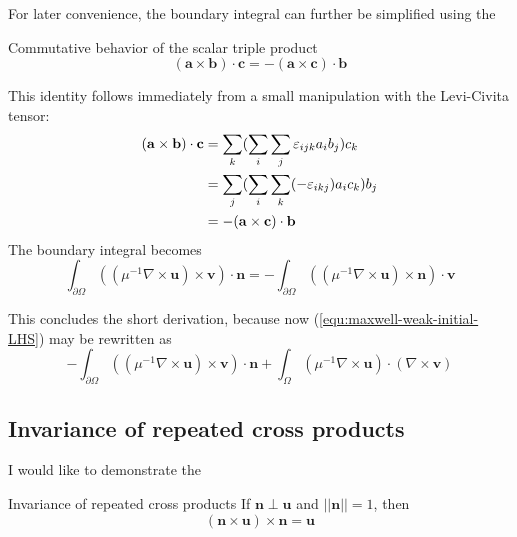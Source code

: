 \documentclass[11pt, a4paper]{article}
\begin{document}
For later convenience, the boundary integral can further be simplified using the
\begin{fancybox}{Commutative behavior of the scalar triple product}
    \begin{equation}
        (\mathbf{a} \times \mathbf{b}) \cdot \mathbf{c} = - (\mathbf{a} \times \mathbf{c}) \cdot \mathbf{b} \label{equ:vector-algebra}
    \end{equation}
\end{fancybox}
This identity follows immediately from a small manipulation with the Levi-Civita
tensor:
\begin{align}
    (\mathbf{a} \times \mathbf{b}) \cdot \mathbf{c} &= \sum_k (\sum_i \sum_j \varepsilon_{ijk} a_i b_j) c_k \notag \\
     &= \sum_j (\sum_i \sum_k (-\varepsilon_{ikj}) a_i c_k) b_j \notag \\ 
     &= - (\mathbf{a} \times \mathbf{c}) \cdot \mathbf{b} 
\end{align}
The boundary integral becomes 
\begin{equation}
    \int_{\partial \Omega} (({\mu^{-1} \nabla \times \mathbf{u}}) \times \mathbf{v}) \cdot \mathbf{n}
    = - \int_{\partial \Omega} (({\mu^{-1} \nabla \times \mathbf{u}}) \times \mathbf{n}) \cdot \mathbf{v}
\end{equation}

This concludes the short derivation, because now (\ref{equ:maxwell-weak-initial-LHS})
may be rewritten as
\begin{equation}
    - \int_{\partial \Omega} (({\mu^{-1} \nabla \times \mathbf{u}}) \times \mathbf{v}) \cdot \mathbf{n}
    + \int_{\Omega} ({\mu^{-1} \nabla \times \mathbf{u}}) \cdot (\nabla \times \mathbf{v})
\end{equation}

\subsection*{Invariance of repeated cross products}
\label{subsec:invariance}

I would like to demonstrate the
\begin{fancybox}{Invariance of repeated cross products}
    If $\mathbf{n} \perp \mathbf{u}$ and $||\mathbf{n}|| = 1$, then
    \begin{equation}
        (\mathbf{n} \times \mathbf{u}) \times \mathbf{n} = \mathbf{u} \label{equ:double-cross-normal}
    \end{equation}
\end{fancybox}
\end{document}
